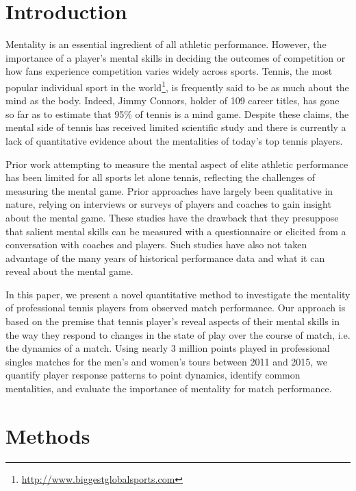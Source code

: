 \documentclass{Latex/svjour3}
\begin{document}
\section{Introduction}

Mentality is an essential ingredient of all athletic
performance. However, the importance of a player's mental skills in
deciding the outcomes of competition or how fans experience
competition varies widely across sports. Tennis, the
most popular individual sport in the
world\footnote{\url{http://www.biggestglobalsports.com}}, is
frequently said to be as much about the mind as the body. Indeed, Jimmy Connors, holder
of 109 career titles, has gone so far as to estimate that 95\% of tennis is a mind
game\cite{samulski2007tennis}. Despite these claims, the mental side
of tennis has received limited scientific study and there is currently
a lack of quantitative
evidence about the mentalities of today's top tennis players.

Prior work attempting to measure the mental aspect of elite
athletic performance has been limited for all sports let alone
tennis, reflecting the challenges of
measuring the mental game. Prior approaches have largely been
qualitative in nature, relying on interviews\cite{young2011understanding} or surveys\cite{taylor1987predicting} of players and
coaches to gain insight about the mental game. These studies have the
drawback that they presuppose that salient mental skills can be
measured with a questionnaire or elicited from a conversation with
coaches and players. Such studies have also not taken advantage of the
many years of historical performance data and what it can reveal about the mental game. 

In this paper, we present a novel quantitative method to investigate the mentality
of professional tennis players from observed match performance. Our approach is based on the premise
that tennis player's
reveal aspects of their mental skills in the way they respond to
changes in the state of play over the course of match, i.e. the
dynamics of a match. Using nearly 3 million points played in
professional singles matches for the men's and women's tours between 2011 and 2015, we quantify player
response patterns to point dynamics, identify common mentalities, and
evaluate the importance of mentality for match performance. 


\section{Methods}
\end{document}
